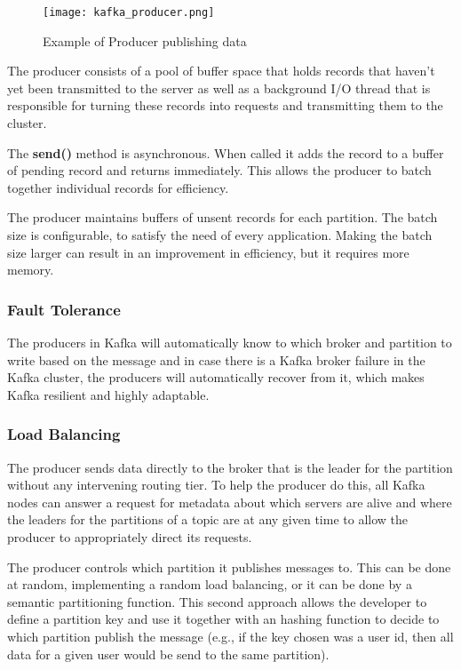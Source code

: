 \begin{figure}[ht]
    \centering
    \texttt{[image: kafka\_producer.png]}
    \caption{Example of Producer publishing data}
\end{figure}

The producer consists of a pool of buffer space that holds records that haven't
yet been transmitted to the server as well as a background I/O thread that is
responsible for turning these records into requests and transmitting them to
the cluster.

The \textbf{send()} method is asynchronous. When called it adds the record to a
buffer of pending record and returns immediately. This allows the producer to
batch together individual records for efficiency.

The producer maintains buffers of unsent records for each partition. The batch
size is configurable, to satisfy the need of every application. Making the
batch size larger can result in an improvement in efficiency, but it requires
more memory.

\subsubsection{Fault Tolerance}

The producers in Kafka will automatically know to which broker and partition to
write based on the message and in case there is a Kafka broker failure in the
Kafka cluster, the producers will automatically recover from it, which makes
Kafka resilient and highly adaptable.

\subsubsection{Load Balancing}

The producer sends data directly to the broker that is the leader for the
partition without any intervening routing tier. To help the producer do this,
all Kafka nodes can answer a request for metadata about which servers are alive
and where the leaders for the partitions of a topic are at any given time to
allow the producer to appropriately direct its requests.

The producer controls which partition it publishes messages to. This can be
done at random, implementing a random load balancing, or it can be done by a
semantic partitioning function.
This second approach allows the developer to define a partition key and use it
together with an hashing function to decide to which partition publish the
message (e.g., if the key chosen was a user id, then all data for a given user
would be send to the same partition).

